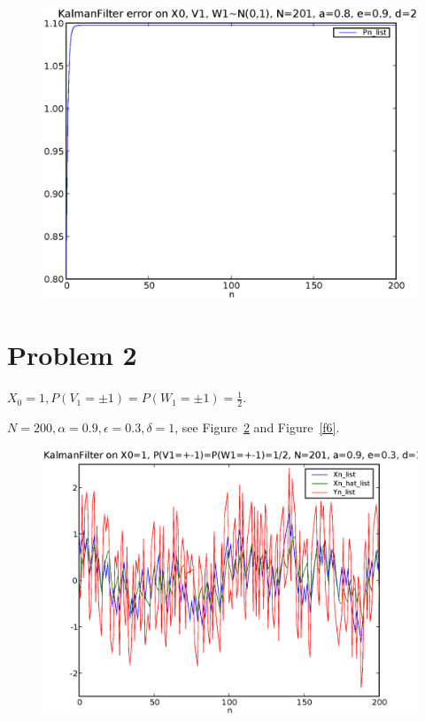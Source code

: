 \documentclass[a4paper,10pt]{article}
\begin{document}
\begin{figure}
\includegraphics[width=1\textwidth]{hw10_1_error_N_201_a_0.8_e_0.9_d_2.eps}
\caption{}\label{f4}
\end{figure}

\section{Problem 2}
$X_0=1, P(V_1=\pm 1)=P(W_1=\pm 1)=\frac{1}{2}$.

$N=200, \alpha=0.9, \epsilon=0.3, \delta=1$, see Figure~\ref{f5} and Figure~\ref{f6}.

\begin{figure}
\includegraphics[width=1\textwidth]{hw10_2_N_201_a_0.9_e_0.3_d_1.eps}
\caption{}\label{f5}
\end{figure}
\end{document}
